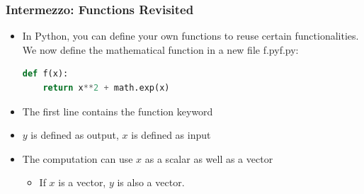   \begin{frame}[fragile]
    \frametitle{Intermezzo: Functions Revisited}
  
    \begin{itemize}
      \item In Python, you can define your own functions to reuse certain functionalities. We now define the mathematical function in a new file f.pyf.py:
      \begin{lstlisting}[language=Python]
def f(x):
    return x**2 + math.exp(x)
      \end{lstlisting}
      \item The first line contains the function keyword
      \item \( y \) is defined as output, \( x \) is defined as input
      \item The computation can use \( x \) as a scalar as well as a vector
      \begin{itemize}
        \item If \( x \) is a vector, \( y \) is also a vector.
      \end{itemize}
    \end{itemize}
  \end{frame}
  
  
      
  
